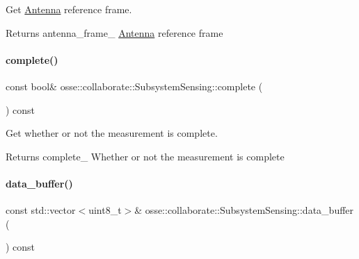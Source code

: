 Get \hyperlink{classosse_1_1collaborate_1_1_antenna}{Antenna} reference frame. 

\begin{DoxyReturn}{Returns}
antenna\+\_\+frame\+\_\+ \hyperlink{classosse_1_1collaborate_1_1_antenna}{Antenna} reference frame 
\end{DoxyReturn}
\mbox{\label{classosse_1_1collaborate_1_1_subsystem_sensing_addbe1b3cecafc40119deaa33359069b5}} 
\paragraph{\texorpdfstring{complete()}{complete()}}
{\footnotesize\ttfamily const bool\& osse\+::collaborate\+::\+Subsystem\+Sensing\+::complete (\begin{DoxyParamCaption}{ }\end{DoxyParamCaption}) const\hspace{0.3cm}{\ttfamily [inline]}}



Get whether or not the measurement is complete. 

\begin{DoxyReturn}{Returns}
complete\+\_\+ Whether or not the measurement is complete 
\end{DoxyReturn}
\mbox{\label{classosse_1_1collaborate_1_1_subsystem_sensing_a094f36e93f5eaa7fa64ddfd7c5194192}} 
\paragraph{\texorpdfstring{data\+\_\+buffer()}{data\_buffer()}}
{\footnotesize\ttfamily const std\+::vector$<$uint8\+\_\+t$>$\& osse\+::collaborate\+::\+Subsystem\+Sensing\+::data\+\_\+buffer (\begin{DoxyParamCaption}{ }\end{DoxyParamCaption}) const\hspace{0.3cm}{\ttfamily [inline]}}



